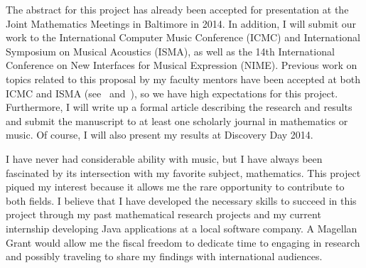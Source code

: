 \documentclass[10pt]{article}
\begin{document}
The abstract for this project has already been accepted for presentation at the
Joint Mathematics Meetings in Baltimore in 2014.  In addition, I will submit our
work to the International Computer Music Conference (ICMC) and International
Symposium on Musical Acoustics (ISMA), as well as the 14th International
Conference on New Interfaces for Musical Expression (NIME). Previous work on
topics related to this proposal by my faculty mentors have been accepted at both
ICMC and ISMA (see~\cite{nonabeliandsp} and~\cite{dissonance}), so we have high
expectations for this project. Furthermore, I will write up a formal article
describing the research and results and submit the manuscript to at least one
scholarly journal in mathematics or music. Of course, I will also 
present my results at Discovery Day 2014.

\vskip5mm

I have never had considerable ability with music, but I have always been
fascinated by its intersection with my favorite subject, mathematics.  This
project piqued my interest because it allows me the rare opportunity to
contribute to both fields.  I believe that I have developed the necessary skills
to succeed in this project through my past mathematical research projects and my
current internship developing Java applications at a local software company.  A
Magellan Grant would allow me the fiscal freedom to dedicate time to engaging in
research and possibly traveling to share my findings with international
audiences.  



\end{document}
